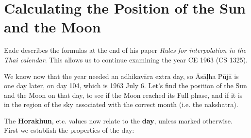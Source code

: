\documentclass[11pt,oneside]{memoir-article}
\begin{document}
\label{adhikavara-years-end}

\section{Calculating the Position of the Sun and the Moon}
\label{sec-4-5}
\label{calculating-the-sun-and-moon}

Eade describes the formulas at the end of his paper \emph{Rules for interpolation in
the Thai calendar}.\autocite{eade2000rules} This allows us to continue examining
the year CE 1963 (CS 1325).


We know now that the year needed an adhikavāra extra day, so Āsāḷha Pūjā is one
day later, on day 104, which is 1963 July 6. Let's find the position of the Sun
and the Moon on that day, to see if the Moon reached its Full phase, and if it
is in the region of the sky associated with the correct month (i.e. the
nakshatra).

The \textbf{Horakhun}, etc. values now relate to the \textbf{day}, unless marked otherwise.
First we establish the properties of the day:

\cheatsheetPar
\end{document}
